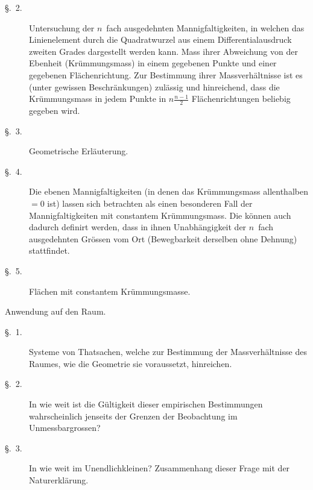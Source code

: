 \documentclass[a4paper,12pt]{article}
\begin{document}
\begin{description}
\begin{description}
\item[\textmd{\S.~2.}]
Untersuchung der $n$~fach ausgedehnten Mannigfaltigkeiten, in
welchen das Linienelement durch die Quadratwurzel aus einem
Differentialausdruck zweiten Grades dargestellt werden kann.  Mass
ihrer Abweichung von der Ebenheit (Kr\"{u}mmungsmass) in einem
gegebenen Punkte und einer gegebenen Fl\"{a}chenrichtung.  Zur
Bestimmung ihrer Massverh\"{a}ltnisse ist es (unter gewissen
Beschr\"{a}nkungen) zul\"{a}ssig und hinreichend, dass die
Kr\"{u}mmungsmass in jedem Punkte in
$\displaystyle n \frac{n - 1}{2}$
Fl\"{a}chenrichtungen beliebig gegeben wird.

\item[\textmd{\S.~3.}]
Geometrische Erl\"{a}uterung.

\item[\textmd{\S.~4.}]
Die ebenen Mannigfaltigkeiten (in denen das Kr\"{u}mmungsmass
allenthalben $= 0$ ist) lassen sich betrachten als einen
besonderen Fall der Mannigfaltigkeiten mit constantem
Kr\"{u}mmungsmass.  Die k\"{o}nnen auch dadurch definirt werden,
dass in ihnen Unabh\"{a}ngigkeit der $n$~fach ausgedehnten
Gr\"{o}ssen vom Ort (Bewegbarkeit derselben ohne Dehnung)
stattfindet.

\item[\textmd{\S.~5.}]
Fl\"{a}chen mit constantem Kr\"{u}mmungsmasse.
\end{description}

\item[\textmd{III.}]
Anwendung auf den Raum.

\begin{description}
\item[\textmd{\S.~1.}]
Systeme von Thatsachen, welche zur Bestimmung der
Massverh\"{a}ltnisse des Raumes, wie die Geometrie sie
voraussetzt, hinreichen.

\item[\textmd{\S.~2.}]
In wie weit ist die G\"{u}ltigkeit dieser empirischen Bestimmungen
wahrscheinlich jenseits der Grenzen der Beobachtung im
Un\-mess\-bar\-grossen?

\item[\textmd{\S.~3.}]
In wie weit im Unendlichkleinen?  Zusammenhang dieser Frage mit
der Naturerkl\"{a}rung.

\end{description}
\end{description}
\end{document}
